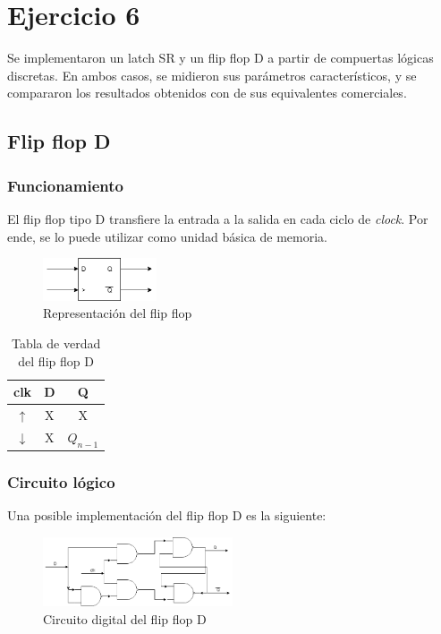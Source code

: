 \documentclass[../../e3_tp2_main.tex]{subfiles}
\begin{document}
\section{Ejercicio 6}

Se implementaron un latch SR y un flip flop D a partir de compuertas lógicas discretas. En ambos casos, se midieron sus parámetros característicos, y se compararon los resultados obtenidos con de sus equivalentes comerciales.
\subsection{Flip flop D}
\subsubsection{Funcionamiento}
El flip flop tipo D transfiere la entrada a la salida en cada ciclo de \textit{clock}. Por ende, se lo puede utilizar como unidad básica de memoria.
\begin{figure}[H]	
	\centering
	\includegraphics[width=0.3\textwidth]{imagenes/ffd_b.png}
	\caption{Representaci\'on del flip flop}
\end{figure}

\begin{table}[H]
\begin{center}
\begin{tabular}{|c|c|c|}
\hline
clk& D & Q\\
\hline \hline
$\uparrow$ & X & X \\ \hline
$\downarrow$ &X  &$Q_{n-1}$ \\ \hline
\end{tabular}
\caption{Tabla de verdad del flip flop D} 
\end{center}
\end{table}

\subsubsection{Circuito lógico}
Una posible implementación del flip flop D es la siguiente:
\begin{figure}[H]	
	\centering
	\includegraphics[width=0.5\textwidth]{imagenes/ffd_cd.png}
	\caption{Circuito digital del flip flop D}
\end{figure}
\end{document}
